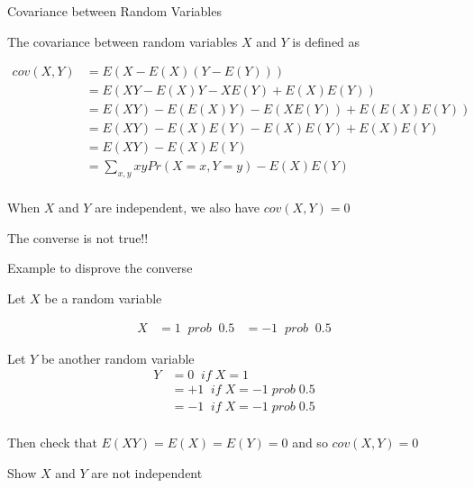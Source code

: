 \documentclass{beamer}\usepackage[]{graphicx}\usepackage[]{color}
\begin{document}
\begin{frame}{Covariance between Random Variables}

The covariance between random variables $X$ and $Y$ is defined as

\begin{align}
cov(X,Y)  & = E(X- E(X)(Y-E(Y)))  \\
          &  = E(XY - E(X)Y - XE(Y) + E(X)E(Y)) \\
          &  = E(XY) - E(E(X)Y) - E(XE(Y)) + E(E(X)E(Y)) \\
          &  = E(XY) - E(X)E(Y) - E(X)E(Y) + E(X)E(Y) \\
          &  = E(XY) - E(X)E(Y) \\
          &  = \sum_{x,y} xy Pr(X=x, Y=y) - E(X)E(Y) \\
\end{align} \pause

When $X$ and $Y$ are independent, we also have $cov(X,Y)=0$ \pause \newline

The converse is not true!!
\end{frame}

\begin{frame}{Example to disprove the converse}

Let $X$ be a random variable

\begin{align}
X & = 1 \;\; prob \;\; 0.5
  & = -1 \;\; prob \;\; 0.5
\end{align}

Let $Y$ be another random variable
\begin{align}
Y & = 0 \;\; if \; X=1 \\
  & = +1 \;\; if \; X=-1 \; prob \; 0.5 \\
  & = -1 \;\; if \; X=-1 \; prob \; 0.5 \\
 \end{align}

 Then check that $E(XY)=E(X)=E(Y)=0$ and so $cov(X,Y)=0$

 Show $X$ and $Y$ are not independent

 \end{frame}
\end{document}
